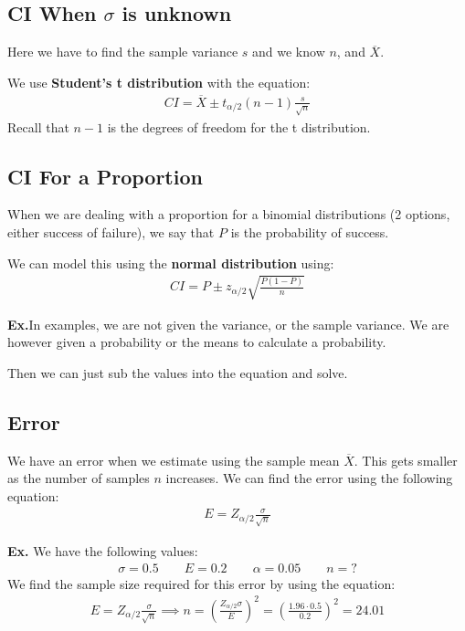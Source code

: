 \documentclass[12pt,letterpaper]{article} \usepackage{amsmath} \usepackage{graphicx} \usepackage[margin=1in]{geometry} \usepackage{longtable}  \usepackage{amssymb}
\begin{document}
	\subsection{CI When $\sigma$ is unknown}
	Here we have to find the sample variance $s$ and we know $n$, and $\overline X$.
	
	We use \textbf{Student's t distribution} with the equation:
	\begin{align*}
		CI = \overline X \pm t_{\alpha/2}(n-1) \frac{s}{\sqrt n}
	\end{align*}
	Recall that $n-1$ is the degrees of freedom for the t distribution.
	
	\subsection{CI For a Proportion}
	When we are dealing with a proportion for a binomial distributions (2 options, either success of failure), we say that $P$ is the probability of success. 
	
	We can model this using the \textbf{normal distribution} using:
	\begin{align*}
		CI = P \pm z_{\alpha/2} \sqrt{\frac{P(1-P)}{n}}
	\end{align*}
	\begin{mdframed}
		\textbf{Ex.}In examples, we are not given the variance, or the sample variance. We are however given a probability or the means to calculate a probability.
		
		Then we can just sub the values into the equation and solve. 
	\end{mdframed}

	\subsection{Error}
	We have an error when we estimate using the sample mean $\overline X$. This gets smaller as the number of samples $n$ increases. We can find the error using the following equation:
	\begin{align*}
		E = Z_{\alpha/2} \frac{\sigma}{\sqrt n}
	\end{align*}

	\begin{mdframed}
		\textbf{Ex.} We have the following values:
		\begin{align*}
			\sigma = 0.5 \qquad E = 0.2 \qquad \alpha = 0.05 \qquad n = ?
		\end{align*}
		We find the sample size required for this error by using the equation:
		\begin{align*}
			E = Z_{\alpha/2} \frac{\sigma}{\sqrt n} \implies n = \left(\frac{Z_{\alpha/2}\sigma}{E}\right)^2= \left(\frac{1.96\cdot 0.5}{0.2}\right)^2 = 24.01
		\end{align*}
	\end{mdframed}
\end{document}
